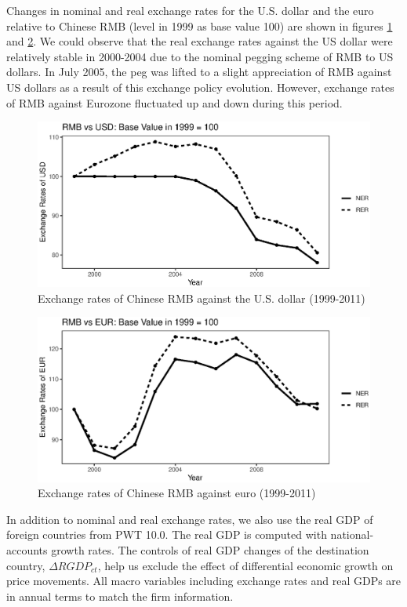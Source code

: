 \documentclass[12pt]{article}
\begin{document}
Changes in nominal and real exchange rates for the U.S. dollar and the euro relative to Chinese RMB (level in 1999 as base value 100) are shown in figures \ref{fig.USD} and \ref{fig.EUR}. We could observe that the real exchange rates against the US dollar were relatively stable in 2000-2004 due to the nominal pegging scheme of RMB to US dollars. In July 2005, the peg was lifted to a slight appreciation of RMB against US dollars as a result of this exchange policy evolution. However, exchange rates of RMB against Eurozone fluctuated up and down during this period. 

\begin{figure}[htbp]
	\centering
	\includegraphics[width=1\textwidth]{R/USD.eps}
	\caption{Exchange rates of Chinese RMB against the U.S. dollar (1999-2011)}
	\label{fig.USD}
\end{figure}

\begin{figure}[htbp]
	\centering
	\includegraphics[width=1\textwidth]{R/EUR.eps}
	\caption{Exchange rates of Chinese RMB against euro (1999-2011)}
	\label{fig.EUR}
\end{figure}

In addition to nominal and real exchange rates, we also use the real GDP of foreign countries from PWT 10.0. The real GDP is computed with national-accounts growth rates. The controls of real GDP changes of the destination country, $\Delta RGDP_{ct}$, help us exclude the effect of differential economic growth on price movements. All macro variables including exchange rates and real GDPs are in annual terms to match the firm information.
\end{document}
